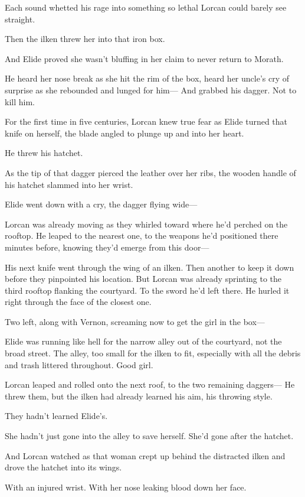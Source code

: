 Each sound whetted his rage into something so lethal Lorcan could barely see straight.

Then the ilken threw her into that iron box.

And Elide proved she wasn't bluffing in her claim to never return to Morath.

He heard her nose break as she hit the rim of the box, heard her uncle's cry of surprise as she rebounded and lunged for him--- And grabbed his dagger. Not to kill him.

For the first time in five centuries, Lorcan knew true fear as Elide turned that knife on herself, the blade angled to plunge up and into her heart.

He threw his hatchet.

As the tip of that dagger pierced the leather over her ribs, the wooden handle of his hatchet slammed into her wrist.

Elide went down with a cry, the dagger flying wide---

Lorcan was already moving as they whirled toward where he'd perched on the rooftop. He leaped to the nearest one, to the weapons he'd positioned there minutes before, knowing they'd emerge from this door---

His next knife went through the wing of an ilken. Then another to keep it down before they pinpointed his location. But Lorcan was already sprinting to the third rooftop flanking the courtyard. To the sword he'd left there. He hurled it right through the face of the closest one.

Two left, along with Vernon, screaming now to get the girl in the box---

Elide was running like hell for the narrow alley out of the courtyard, not the broad street. The alley, too small for the ilken to fit, especially with all the debris and trash littered throughout. Good girl.

Lorcan leaped and rolled onto the next roof, to the two remaining daggers--- He threw them, but the ilken had already learned his aim, his throwing style.

They hadn't learned Elide's.

She hadn't just gone into the alley to save herself. She'd gone after the hatchet.

And Lorcan watched as that woman crept up behind the distracted ilken and drove the hatchet into its wings.

With an injured wrist. With her nose leaking blood down her face.

